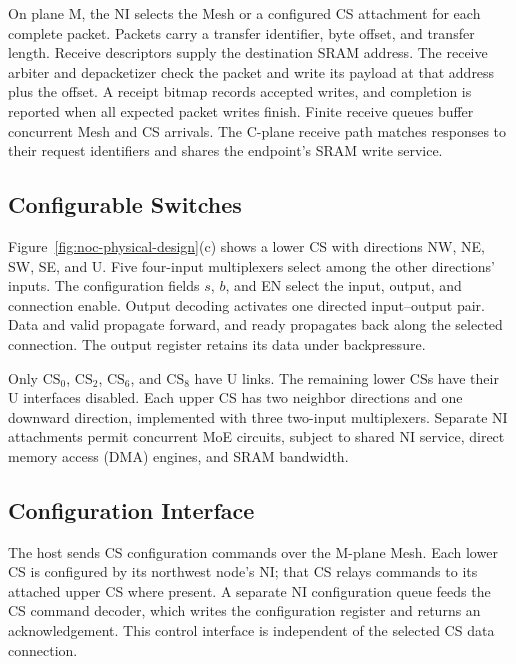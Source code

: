 \documentclass[conference,10pt]{IEEEtran}
\begin{document}
On plane M, the NI selects the Mesh or a configured CS attachment for
each complete packet. Packets carry a transfer identifier, byte offset,
and transfer length. Receive descriptors supply the destination SRAM
address. The receive arbiter and depacketizer check the packet and
write its payload at that address plus the offset. A receipt bitmap
records accepted writes, and completion is reported when all expected
packet writes finish. Finite receive queues buffer concurrent Mesh
and CS arrivals. The C-plane receive path matches responses to their
request identifiers and shares the endpoint's SRAM write service.

\subsection{Configurable Switches}
\label{sec:noc-switches}

Figure~\ref{fig:noc-physical-design}(c) shows a lower CS with directions
NW, NE, SW, SE, and U. Five four-input multiplexers select among the
other directions' inputs. The configuration fields $s$, $b$, and EN
select the input, output, and connection enable. Output decoding
activates one directed input--output pair. Data and valid propagate
forward, and ready propagates back along the selected connection.
The output register retains its data under backpressure.

Only $\mathrm{CS}_0$, $\mathrm{CS}_2$, $\mathrm{CS}_6$, and
$\mathrm{CS}_8$ have U links. The remaining lower CSs have their U
interfaces disabled. Each upper CS has two neighbor directions and
one downward direction, implemented with three two-input multiplexers.
Separate NI attachments permit concurrent MoE circuits, subject to
shared NI service, direct memory access (DMA) engines, and SRAM bandwidth.



\subsection{Configuration Interface}
\label{sec:noc-config-interface}

The host sends CS configuration commands over the M-plane Mesh.
Each lower CS is configured by its northwest node's NI; that CS relays
commands to its attached upper CS where present. A separate NI
configuration queue feeds the CS command decoder, which writes the
configuration register and returns an acknowledgement. This control
interface is independent of the selected CS data connection.
\end{document}
